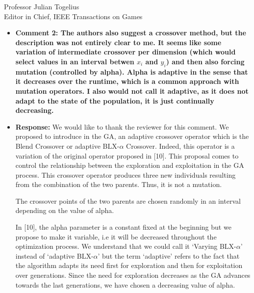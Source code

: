 \documentclass[10pt]{letter} %
\begin{document}
\begin{letter}{Professor Julian Togelius \\ Editor in Chief, IEEE Transactions on Games}
\begin{enumerate}
\begin{itemize}
%		 
		\item {\bf   Comment 2:	The authors also suggest a crossover method, but the description was not entirely clear to me. It seems like some variation of intermediate crossover per dimension (which would select values in an interval betwen $x_i$ and $y_i$) and then also forcing mutation (controlled by alpha). Alpha is adaptive in the sense that it decreases over the runtime, which is a common approach with mutation operators. I also would not call it adaptive, as it does not adapt to the state of the population, it is just continually decreasing.}
		\item {\bf Response:}
		We would like to thank the reviewer for this comment.
		We proposed to introduce in the GA, an adaptive crossover operator which is the Blend Crossover  or adaptive BLX-$\alpha$ Crossover.  Indeed, this operator is a variation of the original operator proposed in [10]. This proposal comes to control the relationship between the exploration and exploitation in the GA process. This crossover operator produces three new individuals resulting from the combination of the two parents. Thus, it is not a mutation.
		
		The crossover points of the two parents are chosen randomly in an interval depending on the value of alpha.
		
		In [10], the alpha parameter is a constant fixed at the beginning but we propose to make it variable, i.e it will be decreased throughout the optimization process.
		We understand that we could call it `Varying BLX-$\alpha$' instead of `adaptive BLX-$\alpha$' but the term `adaptive' refers to the fact that the algorithm adapts its need first for exploration and then for exploitation over generations. Since the need for exploration decreases as the GA advances towards the last generations, we have chosen a decreasing value of alpha.
			
%


\end{itemize}
\end{enumerate}
\end{letter}
\end{document}

